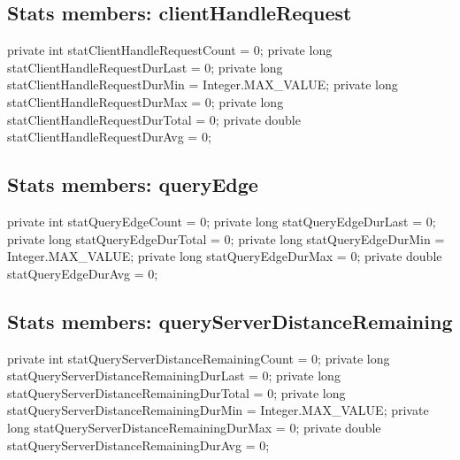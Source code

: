 \subsection{Stats members: clientHandleRequest}
\nwenddocs{}\endmoddef{}
private int    statClientHandleRequestCount = 0;
private long   statClientHandleRequestDurLast = 0;
private long   statClientHandleRequestDurMin = Integer.MAX_VALUE;
private long   statClientHandleRequestDurMax = 0;
private long   statClientHandleRequestDurTotal = 0;
private double statClientHandleRequestDurAvg = 0;
\nwendcode{}\nwdocspar

\subsection{Stats members: queryEdge}
\nwenddocs{}\endmoddef{}
private int    statQueryEdgeCount    = 0;
private long   statQueryEdgeDurLast  = 0;
private long   statQueryEdgeDurTotal = 0;
private long   statQueryEdgeDurMin   = Integer.MAX_VALUE;
private long   statQueryEdgeDurMax   = 0;
private double statQueryEdgeDurAvg   = 0;
\nwendcode{}\nwdocspar

\subsection{Stats members: queryServerDistanceRemaining}
\nwenddocs{}\endmoddef{}
private int    statQueryServerDistanceRemainingCount    = 0;
private long   statQueryServerDistanceRemainingDurLast  = 0;
private long   statQueryServerDistanceRemainingDurTotal = 0;
private long   statQueryServerDistanceRemainingDurMin   = Integer.MAX_VALUE;
private long   statQueryServerDistanceRemainingDurMax   = 0;
private double statQueryServerDistanceRemainingDurAvg   = 0;
\nwendcode{}\nwdocspar

